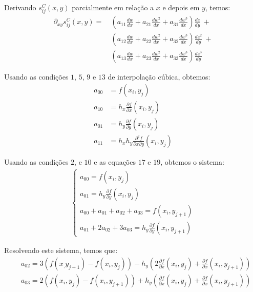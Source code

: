 \documentclass[a4paper, 12pt]{article}
\begin{document}
Derivando $s_{ij}^C(x,y)$ parcialmente em relação a $x$ e depois em $y$, temos:
\begin{align*}
    \partial_{xy}s_{ij}^C(x, y) =\ &\left(a_{11}\frac{dw}{dx} + a_{21}\frac{dw^2}{dx} + a_{31}\frac{dw^3}{dx}\right)
                            \frac{dz}{dy}\ + \\ 
                            &\left(a_{12}\frac{dw}{dx} + a_{22}\frac{dw^2}{dx} + a_{32}\frac{dw^3}{dx}\right)
                            \frac{dz^2}{dy}\ + \\ 
                            &\left(a_{13}\frac{dw}{dx} + a_{23}\frac{dw^2}{dx} + a_{33}\frac{dw^3}{dx}\right)
                            \frac{dz^3}{dy} 
\end{align*}

Usando as condições $1$,  $5$, $9$ e $13$ de interpolação cúbica, obtemos:
\begin{align}
    a_{00} &= f(x_{i}, y_{j}) \tag{17}\\
    a_{10} &= h_{x} \frac{\partial f}{\partial x}(x_{i}, y_{j}) \tag{18} \\
    a_{01} &= h_{y} \frac{\partial f}{\partial y}(x_i, y_j) \tag{19} \\
    a_{11} &= h_x h_y \frac{\partial^2 f}{\partial x \partial y}(x_i, y_j) \tag{20}
\end{align}

Usando as condições $2$, e $10$ e as equações $17$ e $19$, obtemos o sistema:
\begin{align*}
    \begin{cases}
        a_{00} = f(x_{i}, y_{j}) \\
        a_{01} = h_y \frac{\partial f}{\partial y}(x_i, y_j) \\
        a_{00} + a_{01} + a_{02} + a_{03} = f(x_i, y_{j+1}) \\
        a_{01} + 2a_{02} + 3a_{03} = h_y \frac{\partial f}{\partial y}(x_i, y_{j+1}) 
    \end{cases}
\end{align*}

Resolvendo este sistema, temos que:
\begin{align}
    &a_{02} = 3(f(x_, y_{j+1}) - f(x_i, y_j)) - 
        h_y \left(2\frac{\partial f}{\partial x}(x_i, y_j) + \frac{\partial f}{\partial x}(x_i,y_{j+1})\right)
    \tag{21} \\
    &a_{03} = 2(f(x_i, y_j) - f(x_i, y_{j+1})) + 
    h_y \left(\frac{\partial f}{\partial x}(x_i, y_j) + \frac{\partial f}{\partial x}(x_i,y_{j+1})\right)
    \tag{22}
\end{align}
\end{document}

